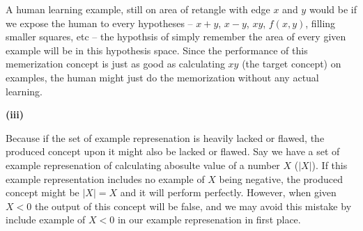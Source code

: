 \documentclass[12pt]{article}
\begin{document}
A human learning example, still on area of retangle with edge $x$ and $y$ would be if we expose the human to every hypotheses -- $x + y$, $x-y$, $xy$, $f(x, y)$, filling smaller squares, etc -- the hypothsis of simply remember the area of every given example will be in this hypothesis space. Since the performance of this memerization concept is just as good as calculating $xy$ (the target concept) on examples, the human might just do the memorization without any actual learning.\newline

\noindent\textbf{(iii)}

Because if the set of example represenation is heavily lacked or flawed, the produced concept upon it might also be lacked or flawed. Say we have a set of example represenation of calculating abosulte value of a number $X$ ($|X|$). If this example representation includes no example of $X$ being negative, the produced concept might be $|X| = X$ and it will perform perfectly. However, when given $X < 0$ the output of this concept will be false, and we may avoid this mistake by include example of $X<0$ in our example represenation in first place.


% 
% 
\end{document}
